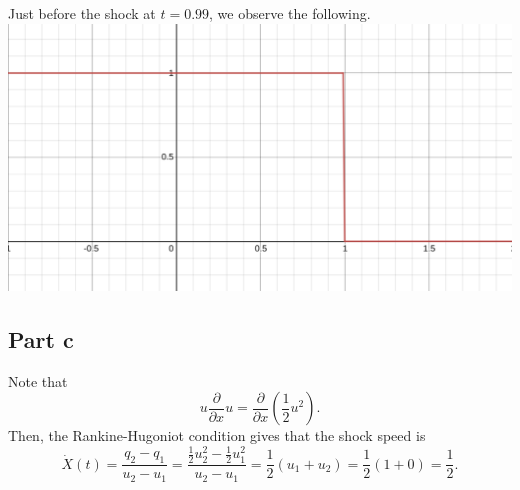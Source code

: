 \documentclass{article}
\begin{document}
Just before the shock at $t=0.99$, we observe the following. \\
\includegraphics[scale=0.3]{graph3.png}\\

\subsection{Part c}
Note that
\[
u\frac{\partial }{\partial x}u=\frac{\partial }{\partial x}\left(\frac{1}{2}u^2\right). 
\]
Then, the Rankine-Hugoniot condition gives that the shock speed is 
\[
\dot{X}(t)=\frac{q_2-q_1}{u_2-u_1}=\frac{\frac{1}{2}u_2^2-\frac{1}{2}u_1^2}{u_2-u_1}=\frac{1}{2}(u_1+u_2)=\frac{1}{2}(1+0)=\frac{1}{2}.
\]
\end{document}
